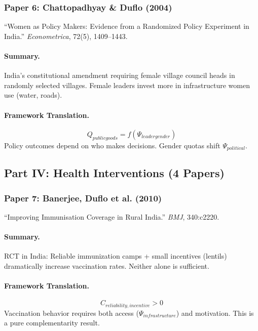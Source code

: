 \subsubsection{Paper 6: Chattopadhyay \& Duflo (2004)}

``Women as Policy Makers: Evidence from a Randomized Policy Experiment in India.''
\textit{Econometrica}, 72(5), 1409--1443.

\paragraph{Summary.}
India's constitutional amendment requiring female village council heads in randomly
selected villages. Female leaders invest more in infrastructure women use (water, roads).

\paragraph{Framework Translation.}
\begin{equation}
  Q_{public goods} = f(\Psi_{leader gender})
\end{equation}
Policy outcomes depend on who makes decisions. Gender quotas shift $\Psi_{political}$.

\subsection{Part IV: Health Interventions (4 Papers)}

\subsubsection{Paper 7: Banerjee, Duflo et al. (2010)}

``Improving Immunisation Coverage in Rural India.''
\textit{BMJ}, 340:c2220.

\paragraph{Summary.}
RCT in India: Reliable immunization camps + small incentives (lentils) dramatically
increase vaccination rates. Neither alone is sufficient.

\paragraph{Framework Translation.}
\begin{equation}
  C_{reliability, incentive} > 0
\end{equation}
Vaccination behavior requires both access ($\Psi_{infrastructure}$) and motivation.
This is a pure complementarity result.

